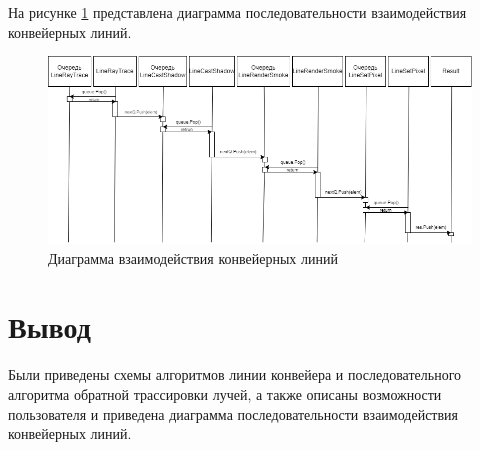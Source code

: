 На рисунке \ref{fig:conveyor} представлена диаграмма последовательности взаимодействия конвейерных линий.
\begin{figure}[H]
	\centering
	\includegraphics[width=1\linewidth]{inc/img/conveyor}
	\caption{Диаграмма взаимодействия конвейерных линий}
	\label{fig:conveyor}
\end{figure}



\section*{Вывод}

Были приведены схемы алгоритмов линии конвейера и последовательного алгоритма обратной трассировки лучей, а также описаны возможности пользователя и приведена диаграмма последовательности взаимодействия конвейерных линий.


